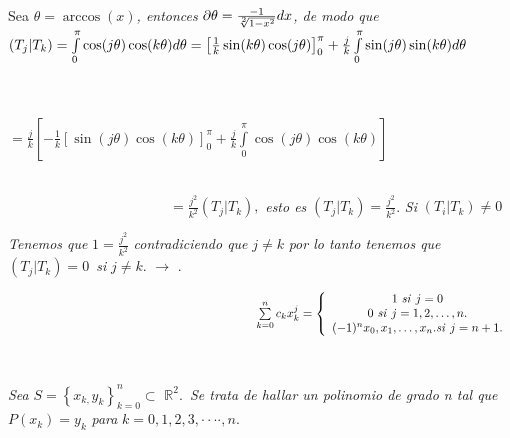 \documentclass{article}
\begin{document}
Sea $\theta =\arccos (x)$\textit{, entonces }$\partial \theta =\frac{-1}{%
\sqrt[2]{1-x^{2}}}dx$\textit{, de modo que }$(T_{j}|T_{k})=\int\limits_{0}^{%
\pi }\cos (j\theta )\cos (k\theta )d\theta =\left[ \frac{1}{k}\sin (k\theta
)\cos (j\theta )\right] _{0}^{\pi }+\frac{j}{k}\int\limits_{0}^{\pi }\sin
(j\theta )\sin (k\theta )d\theta $

\ \ \ \ \ \ \ \ \ \ \ \ \ \ \ \ \ \ \ \ \ \ \ \ \ \ \ \ \ \ \ \ \ \ \ \ \ \
\ \ \ \ \ \ \ \ \ \ \ \ \ \ \ \ \ \ \ \ \ \ \ \ \ \ \ \ \ \ \ \ \ \ \ \ \ \
\ \ \ \ \ \ \ \ \ \ \ \ \ \ \ \ \ \ \ $=\frac{j}{k}\left[ -\frac{1}{k}\left[
\sin (j\theta )\cos (k\theta )\right] _{0}^{\pi }+\frac{j}{k}%
\int\limits_{0}^{\pi }\cos (j\theta )\cos (k\theta )\right] $

\ \ \ \ \ \ \ \ \ \ \ \ \ \ \ \ \ \ \ \ \ \ \ \ \ \ \ \ \ \ \ \ \ \ \ \ \ \
\ \ \ \ \ \ \ \ \ \ \ \ \ \ \ \ \ \ \ \ \ \ \ \ \ \ \ \ \ \ \ \ \ \ \ \ \ \
\ \ \ \ \ \ \ \ \ \ \ \ \ \ \ \ \ \ \ $=\frac{j^{2}}{k^{2}}(T_{j}|T_{k}),$%
\textit{esto es }$(T_{j}|T_{k})=\frac{j^{2}}{k^{2}}$. \textit{Si }$%
(T_{i}|T_{k})\neq 0$

\textit{Tenemos que }$1=\frac{j^{2}}{k^{2}}$ \textit{contradiciendo que }$%
j\neq k$ \textit{por lo tanto tenemos que }$(T_{j}|T_{k})=0$\textit{\ si }$%
j\neq k$. $\rightarrow $ .

\bigskip


$\ \ \ \ \ \ \ \ \ \ \ \ \ \ \ \ \ \ \ \ \ \ \ \ \ \ \ \ \ \ \ \ \ \ \ \ \ \
\ \ \ \ \ \ \ \ \ \ \ \ \ \ \ \ \ \ \ \ \ \ \ \
\sum\limits_{k=0}^{n}c_{k}x_{k}^{j}=\left\{ 
\begin{array}{c}
1\text{ \textit{si }}j=0 \\ 
0\text{ \textit{si }}j=1,2,\ldots ,n. \\ 
(-1)^{n}x_{0},x_{1},\ldots ,x_{n}.\text{\textit{si }}j=n+1.%
\end{array}%
\right. $

\ \ \ \ \ \ \ \ \ \ \ \ \ \ \ \ \ \ \ \ \ \ 

\textit{Sea }$S=\left\{ x_{k,}y_{k}\right\} _{k=0}^{n}\subset $ $%
\mathbb{R}
^{2}$.\textit{\ Se trata de hallar un polinomio de grado n tal que }$%
P(x_{k})=y_{k}$ \textit{para }$k=0,1,2,3,\cdot \cdot \cdot \cdot ,n$.
\end{document}
